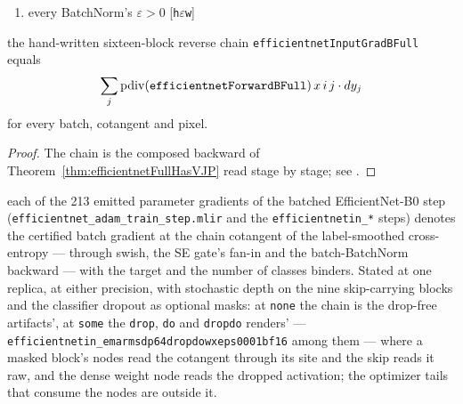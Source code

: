 \begin{theorem}
  \label{thm:efficientnet_whole_back}
  \leanok
  \Assume{}
  \begin{enumerate}
    \item every BatchNorm's \(\varepsilon > 0\) \hfill[\texttt{h\(\varepsilon\)w}]
  \end{enumerate}
  \Prove{} the hand-written sixteen-block reverse chain
  \texttt{efficientnetInputGradBFull} equals
  \[
    \sum_j \operatorname{pdiv}(\texttt{efficientnetForwardBFull})\, x\, i\, j \cdot dy_j
  \]
  for every batch, cotangent and pixel.
\end{theorem}

\begin{proof}
\leanok
The chain is the composed backward of
Theorem~\ref{thm:efficientnetFullHasVJP} read stage by stage; see
.
\end{proof}

\begin{theorem}
  \label{thm:efficientnet_step_tie}
  \leanok
  \Prove{} each of the 213 emitted parameter gradients of the batched
  EfficientNet-B0 step (\texttt{efficientnet\_adam\_train\_step.mlir} and
  the \texttt{efficientnetin\_*} steps) denotes the certified batch
  gradient at the chain cotangent of the label-smoothed cross-entropy ---
  through swish, the SE gate's fan-in and the batch-BatchNorm backward ---
  with the target and the number of classes binders. Stated at one replica,
  at either precision, with stochastic depth on the nine skip-carrying
  blocks and the classifier dropout as optional masks: at \texttt{none} the
  chain is the drop-free artifacts', at \texttt{some} the \texttt{drop},
  \texttt{do} and \texttt{dropdo} renders' ---
  \texttt{efficientnetin\_emarmsdp64dropdowxeps0001bf16} among them ---
  where a masked block's nodes read the cotangent through its site and the
  skip reads it raw, and the dense weight node reads the dropped
  activation; the optimizer tails that consume the nodes are outside it.
\end{theorem}

